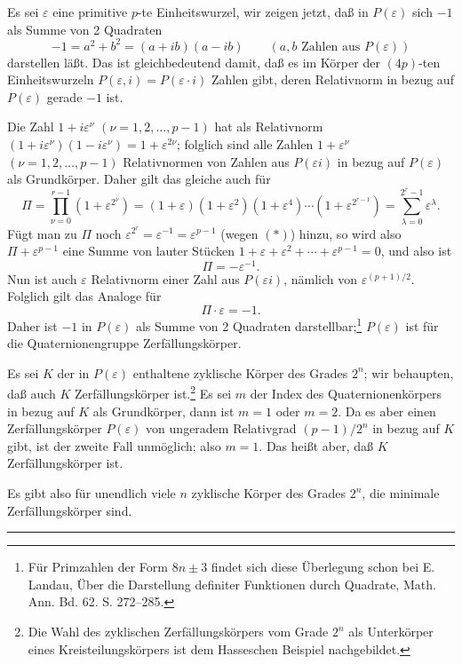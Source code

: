 Es sei $\varepsilon$ eine primitive $p$-te Einheitswurzel, wir zeigen jetzt, daß in $P(\varepsilon)$ sich $-1$ als Summe von 2 Quadraten
\[
        -1=a^2+b^2=(a+ib)(a-ib)\qquad (a,b\text{ Zahlen aus }P(\varepsilon))
\]
darstellen läßt. Das ist gleichbedeutend damit, daß es im Körper der $(4p)$-ten Einheitswurzeln $P(\varepsilon,i)=P(\varepsilon\cdot i)$ Zahlen gibt, deren Relativnorm in bezug auf $P(\varepsilon)$ gerade $-1$ ist.

Die Zahl $1+i\varepsilon^\nu$ $(\nu=1,2,\ldots,p-1)$ hat als Relativnorm $(1+i\varepsilon^\nu)(1-i\varepsilon^\nu)=1+\varepsilon^{2\nu}$; folglich sind alle Zahlen $1+\varepsilon^\nu$ $(\nu=1,2,\ldots,p-1)$ Relativnormen von Zahlen aus $P(\varepsilon i)$ in bezug auf $P(\varepsilon)$ als Grundkörper. Daher gilt das gleiche auch für
\[
\Pi=\prod_{\nu=0}^{r-1}(1+\varepsilon^{2^\nu})
=(1+\varepsilon)(1+\varepsilon^2)(1+\varepsilon^4)\cdots(1+\varepsilon^{2^{r-1}})
=\sum_{\lambda=0}^{2^r-1}\varepsilon^\lambda.
\]
Fügt man zu $\Pi$ noch $\varepsilon^{2^r}=\varepsilon^{-1}=\varepsilon^{p-1}$ (wegen $(*)$) hinzu, so wird also $\Pi+\varepsilon^{p-1}$ eine Summe von lauter Stücken $1+\varepsilon+\varepsilon^2+\cdots+\varepsilon^{p-1}=0$, und also ist
\[
        \Pi=-\varepsilon^{-1}.
\]
Nun ist auch $\varepsilon$ Relativnorm einer Zahl aus $P(\varepsilon i)$, nämlich von $\varepsilon^{(p+1)/2}$. Folglich gilt das Analoge für
\[
        \Pi\cdot\varepsilon=-1.
\]
Daher ist $-1$ in $P(\varepsilon)$ als Summe von 2 Quadraten darstellbar;\footnote{Für Primzahlen der Form $8n\pm3$ findet sich diese Überlegung schon bei E. Landau, Über die Darstellung definiter Funktionen durch Quadrate, Math. Ann. Bd. 62. S. 272--285.} $P(\varepsilon)$ ist für die Quaternionengruppe Zerfällungskörper.

Es sei $K$ der in $P(\varepsilon)$ enthaltene zyklische Körper des Grades $2^n$; wir behaupten, daß auch $K$ Zerfällungskörper ist.\footnote{Die Wahl des zyklischen Zerfällungskörpers vom Grade $2^n$ als Unterkörper eines Kreisteilungskörpers ist dem Hasseschen Beispiel nachgebildet.} Es sei $m$ der Index des Quaternionenkörpers in bezug auf $K$ als Grundkörper, dann ist $m=1$ oder $m=2$. Da es aber einen Zerfällungskörper $P(\varepsilon)$ von ungeradem Relativgrad $(p-1)/2^n$ in bezug auf $K$ gibt, ist der zweite Fall unmöglich; also $m=1$. Das heißt aber, daß $K$ Zerfällungskörper ist.

Es gibt also für unendlich viele $n$ zyklische Körper des Grades $2^n$, die minimale Zerfällungskörper sind.

\begin{center}
\rule{7em}{0.4pt}
\end{center}

\clearpage
\setcounter{footnote}{0}

